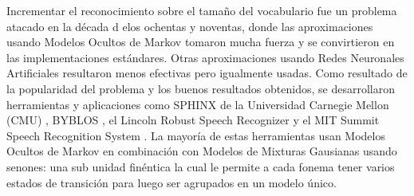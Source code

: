 Incrementar el reconocimiento sobre el tamaño del vocabulario fue un problema atacado en la década d elos ochentas y noventas, donde las aproximaciones usando Modelos Ocultos de Markov tomaron mucha fuerza \cite{RabinerARecognition} y se convirtieron en las implementaciones estándares. Otras aproximaciones usando Redes Neuronales Artificiales resultaron menos efectivas \cite{Waibel1989PhonemeNetworks} pero igualmente usadas. Como resultado de la popularidad del problema y los buenos resultados obtenidos, se desarrollaron herramientas y aplicaciones como SPHINX de la Universidad Carnegie Mellon (CMU) \cite{Lee1990AnSystem}, BYBLOS \cite{ChowBYBLOS:System}, el Lincoln Robust Speech Recognizer \cite{PaulTheRecognizer} y el MIT Summit Speech Recognition System \cite{Zue1989TheReport}. La mayoría de estas herramientas usan Modelos Ocultos de Markov en combinación con Modelos de Mixturas Gausianas usando senones: una sub unidad finéntica la cual le permite a cada fonema tener varios estados de transición para luego ser agrupados en un modelo único.


